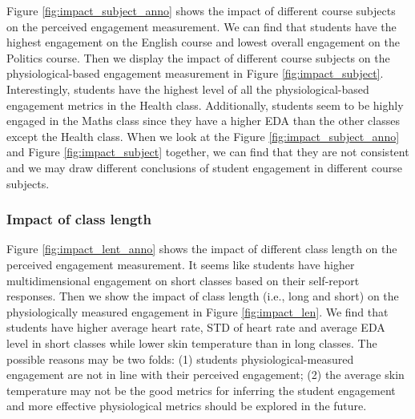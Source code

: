 \documentclass[sigconf]{acmart}
\begin{document}
Figure \ref{fig:impact_subject_anno} shows the impact of different course subjects on the perceived engagement measurement. We can find that students have the highest engagement on the English course and lowest overall engagement on the Politics course. Then we display the impact of different course subjects on the physiological-based engagement measurement in 
Figure \ref{fig:impact_subject}. Interestingly, students have the highest level of all the physiological-based engagement metrics in the Health class. Additionally, students seem to be highly engaged in the Maths class since they have a higher EDA than the other classes except the Health class. When we look at the Figure \ref{fig:impact_subject_anno} and Figure  \ref{fig:impact_subject} together, we can find that they are not consistent and we may draw different conclusions of student engagement in different course subjects.


\subsubsection{Impact of class length}

Figure \ref{fig:impact_lent_anno} shows the impact of different class length on the perceived engagement measurement. It seems like students have higher multidimensional engagement on short classes based on their self-report responses. Then we show the impact of class length (i.e., long and short) on the physiologically measured engagement in Figure \ref{fig:impact_len}. We find that students have higher average heart rate, STD of heart rate and average EDA level in short classes while lower skin temperature than in long classes. The possible reasons may be two folds: (1) students physiological-measured engagement are not in line with their perceived engagement; (2) the average skin temperature may not be the good metrics for inferring the student engagement and more effective physiological metrics should be explored in the future.






\end{document}
